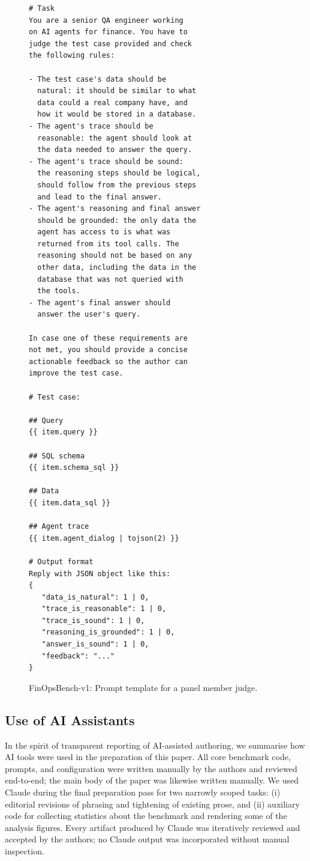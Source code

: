 \documentclass[11pt]{article}
\newcommand{\editN}[1]{\textcolor{editgreen}{#1}}
\newcommand{\synthsubset}{FinOpsBench-v1}\xspace
\begin{document}
\begin{figure}[t]
\small\centering
\begin{verbatim}
# Task
You are a senior QA engineer working
on AI agents for finance. You have to 
judge the test case provided and check 
the following rules:

- The test case's data should be 
  natural: it should be similar to what 
  data could a real company have, and 
  how it would be stored in a database.
- The agent's trace should be 
  reasonable: the agent should look at 
  the data needed to answer the query.
- The agent's trace should be sound: 
  the reasoning steps should be logical, 
  should follow from the previous steps 
  and lead to the final answer.
- The agent's reasoning and final answer 
  should be grounded: the only data the 
  agent has access to is what was 
  returned from its tool calls. The 
  reasoning should not be based on any 
  other data, including the data in the 
  database that was not queried with 
  the tools.
- The agent's final answer should 
  answer the user's query.

In case one of these requirements are 
not met, you should provide a concise
actionable feedback so the author can 
improve the test case.

# Test case:

## Query
{{ item.query }}

## SQL schema
{{ item.schema_sql }}

## Data
{{ item.data_sql }}

## Agent trace
{{ item.agent_dialog | tojson(2) }}

# Output format
Reply with JSON object like this:
{
   "data_is_natural": 1 | 0,
   "trace_is_reasonable": 1 | 0,
   "trace_is_sound": 1 | 0,
   "reasoning_is_grounded": 1 | 0,
   "answer_is_sound": 1 | 0,
   "feedback": "..."
}
\end{verbatim}
\caption{\synthsubset: Prompt template for a 
\editN{panel}
member judge.}
\label{fig:judge-prompt}
\end{figure}

\editN{\section{Use of AI Assistants}}
\editN{\label{app:ai_usage}}

\editN{In the spirit of transparent reporting of AI-assisted authoring, we summarise how AI tools were used in the preparation of this paper. All core benchmark code, prompts, and configuration were written manually by the authors and reviewed end-to-end; the main body of the paper was likewise written manually. We used Claude \citep{anthropic2024claude3} during the final preparation pass for two narrowly scoped tasks: (i) editorial revisions of phrasing and tightening of existing prose, and (ii) auxiliary code for collecting statistics about the benchmark and rendering some of the analysis figures. Every artifact produced by Claude was iteratively reviewed and accepted by the authors; no Claude output was incorporated without manual inspection.}
\end{document}
